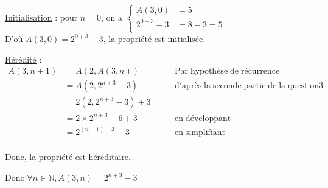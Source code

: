 \begin{enumerate}
\underline{Initialisation} :  pour $n=0$, on a  $ \left\lbrace 
                                                                       \begin{array}{rl}
                                                                       A(3,0) & = 5 \\
                                                                       2^{0+3} - 3    & = 8 -3 = 5  \\
                                                                       \end{array}
                                                                    \right. $ \\
 D'où $A(3,0) = 2^{0+3} - 3 $,  la propriété est initialisée.

 \underline{Hérédité} :  \\
  $  \begin{array}{rll}
                                         A (3, n+1) & = A\left(2, A(3,n)\right)  & \qquad \mathrm{Par\; hypothèse\; de\; récurrence} \\
                                                          & = A (2, 2^{n+3}-3)  & \qquad \mathrm{d'après \;la \;seconde \;partie \;de\;la\;question 3 } \\
                                                          & = 2(2,2^{n+3}-3)+3   &  \\                                                          
                                                          & = 2 \times 2^{n+3} -6 + 3 & \qquad \mathrm{en \; développant} \\
                                                          & =   2^{(n+1)+3 } -3  & \qquad \mathrm{en \; simplifiant} \\
                                        \end{array} $ 
                                        
 \bigskip 
                                       
Donc, la propriété est héréditaire.

 \bigskip 

Donc $\forall n \in  \mathbb{N}, A(3,n) = 2^{n+3} - 3 $         


\end{enumerate}

\ifdefined\COMPLETE
\else
    
\fi
